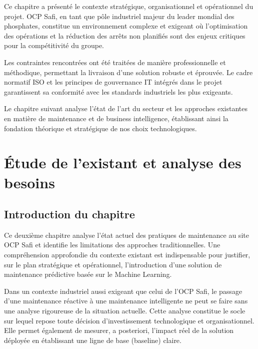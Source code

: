 \documentclass[a4paper,12pt]{report}
\begin{document}
Ce chapitre a présenté le contexte stratégique, organisationnel et opérationnel du projet. OCP Safi, en tant que pôle industriel majeur du leader mondial des phosphates, constitue un environnement complexe et exigeant où l'optimisation des opérations et la réduction des arrêts non planifiés sont des enjeux critiques pour la compétitivité du groupe.

Les contraintes rencontrées ont été traitées de manière professionnelle et méthodique, permettant la livraison d'une solution robuste et éprouvée. Le cadre normatif ISO et les principes de gouvernance IT intégrés dans le projet garantissent sa conformité avec les standards industriels les plus exigeants.

Le chapitre suivant analyse l'état de l'art du secteur et les approches existantes en matière de maintenance et de business intelligence, établissant ainsi la fondation théorique et stratégique de nos choix technologiques.


\chapter{Étude de l'existant et analyse des besoins}

\section*{Introduction du chapitre}

Ce deuxième chapitre analyse l'état actuel des pratiques de maintenance au site OCP Safi et identifie les limitations des approches traditionnelles. Une compréhension approfondie du contexte existant est indispensable pour justifier, sur le plan stratégique et opérationnel, l'introduction d'une solution de maintenance prédictive basée sur le Machine Learning.

Dans un contexte industriel aussi exigeant que celui de l'OCP Safi, le passage d'une maintenance réactive à une maintenance intelligente ne peut se faire sans une analyse rigoureuse de la situation actuelle. Cette analyse constitue le socle sur lequel repose toute décision d'investissement technologique et organisationnel. Elle permet également de mesurer, a posteriori, l'impact réel de la solution déployée en établissant une ligne de base (baseline) claire.
\end{document}
